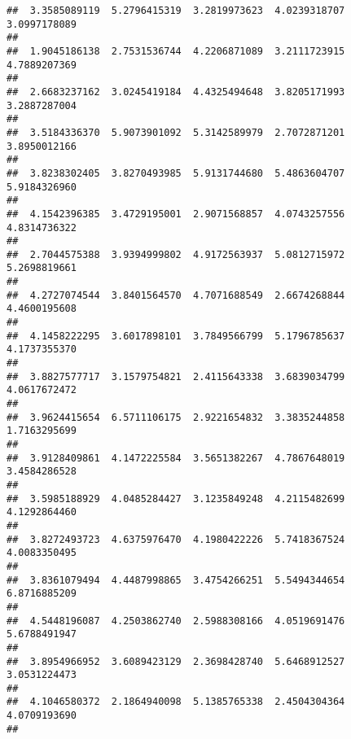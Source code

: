 \documentclass[]{article}
\begin{document}
\begin{verbatim}
##  3.3585089119  5.2796415319  3.2819973623  4.0239318707  3.0997178089 
##                                                                       
##  1.9045186138  2.7531536744  4.2206871089  3.2111723915  4.7889207369 
##                                                                       
##  2.6683237162  3.0245419184  4.4325494648  3.8205171993  3.2887287004 
##                                                                       
##  3.5184336370  5.9073901092  5.3142589979  2.7072871201  3.8950012166 
##                                                                       
##  3.8238302405  3.8270493985  5.9131744680  5.4863604707  5.9184326960 
##                                                                       
##  4.1542396385  3.4729195001  2.9071568857  4.0743257556  4.8314736322 
##                                                                       
##  2.7044575388  3.9394999802  4.9172563937  5.0812715972  5.2698819661 
##                                                                       
##  4.2727074544  3.8401564570  4.7071688549  2.6674268844  4.4600195608 
##                                                                       
##  4.1458222295  3.6017898101  3.7849566799  5.1796785637  4.1737355370 
##                                                                       
##  3.8827577717  3.1579754821  2.4115643338  3.6839034799  4.0617672472 
##                                                                       
##  3.9624415654  6.5711106175  2.9221654832  3.3835244858  1.7163295699 
##                                                                       
##  3.9128409861  4.1472225584  3.5651382267  4.7867648019  3.4584286528 
##                                                                       
##  3.5985188929  4.0485284427  3.1235849248  4.2115482699  4.1292864460 
##                                                                       
##  3.8272493723  4.6375976470  4.1980422226  5.7418367524  4.0083350495 
##                                                                       
##  3.8361079494  4.4487998865  3.4754266251  5.5494344654  6.8716885209 
##                                                                       
##  4.5448196087  4.2503862740  2.5988308166  4.0519691476  5.6788491947 
##                                                                       
##  3.8954966952  3.6089423129  2.3698428740  5.6468912527  3.0531224473 
##                                                                       
##  4.1046580372  2.1864940098  5.1385765338  2.4504304364  4.0709193690 
##                                                                       

\end{verbatim}
\end{document}
